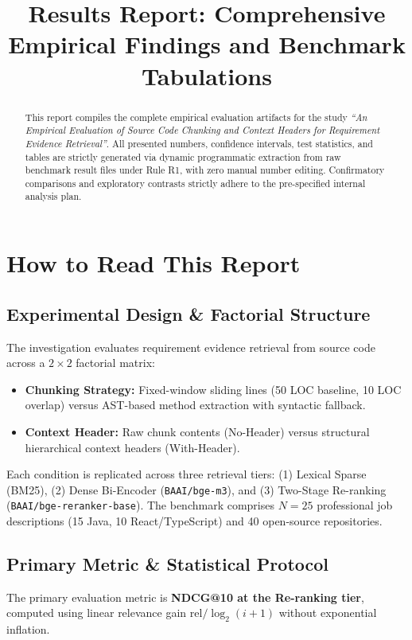 \documentclass[conference]{IEEEtran}
\begin{document}
\title{Results Report: Comprehensive Empirical Findings and Benchmark Tabulations}
\author{
}

\maketitle

\begin{abstract}
This report compiles the complete empirical evaluation artifacts for the study \textit{``An Empirical Evaluation of Source Code Chunking and Context Headers for Requirement Evidence Retrieval''}. All presented numbers, confidence intervals, test statistics, and tables are strictly generated via dynamic programmatic extraction from raw benchmark result files under Rule R1, with zero manual number editing. Confirmatory comparisons and exploratory contrasts strictly adhere to the pre-specified internal analysis plan.
\end{abstract}

\section{How to Read This Report}
\subsection{Experimental Design \& Factorial Structure}
The investigation evaluates requirement evidence retrieval from source code across a $2\times 2$ factorial matrix:
\begin{itemize}
    \item \textbf{Chunking Strategy:} Fixed-window sliding lines (50 LOC baseline, 10 LOC overlap) versus AST-based method extraction with syntactic fallback.
    \item \textbf{Context Header:} Raw chunk contents (No-Header) versus structural hierarchical context headers (With-Header).
\end{itemize}
Each condition is replicated across three retrieval tiers: (1) Lexical Sparse (BM25), (2) Dense Bi-Encoder (\texttt{BAAI/bge-m3}), and (3) Two-Stage Re-ranking (\texttt{BAAI/bge-reranker-base}). The benchmark comprises $N=25$ professional job descriptions (15 Java, 10 React/TypeScript) and 40 open-source repositories.

\subsection{Primary Metric \& Statistical Protocol}
The primary evaluation metric is \textbf{NDCG@10 at the Re-ranking tier}, computed using linear relevance gain $\mathrm{rel}/\log_2(i+1)$ without exponential inflation.
\end{document}
